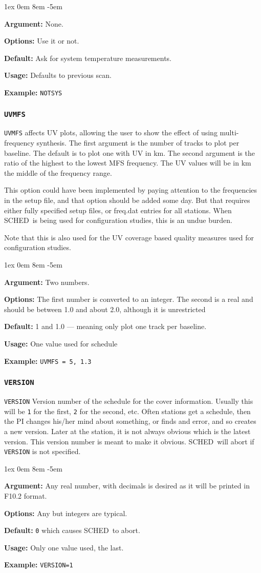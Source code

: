 \documentclass{report}
\newcommand{\schedb}{{\sc SCHED~}}
\newcommand{\rcwbox}[5]{
  \begin{list}{}{\parsep 1ex  \itemsep 0em
                 \leftmargin 8em  \itemindent -5em }
    \item {\bf Argument:} #1
    \item {\bf Options:}  #2
    \item {\bf Default:}  #3
    \item {\bf Usage:}    #4
    \item {\bf Example:}  #5
  \end{list}
}
\begin{document}
\rcwbox
{None.}
{Use it or not.}
{Ask for system temperature measurements.}
{Defaults to previous scan.}
{{\tt NOTSYS}}


\subsubsection{\label{MP:UVMFS}{\tt UVMFS}}

{\tt UVMFS} affects UV plots, allowing the user to show the effect
of using multi-frequency synthesis.  The first argument is the
number of tracks to plot per baseline.  The default is to plot one
with UV in km.  The second argument is the ratio of the highest
to the lowest MFS frequency.  The UV values will be in km the
middle of the frequency range.

This option could have been implemented by paying attention to
the frequencies in the setup file, and that option should be
added some day.  But that requires either fully specified setup
files, or freq.dat entries for all stations.  When \schedb is being
used for configuration studies, this is an undue burden.

Note that this is also used for the UV coverage based quality
measures used for configuration studies.

\rcwbox
{Two numbers.}
{The first number is converted to an integer.  The second is a real
and should be between 1.0 and about 2.0, although it is unrestricted}
{1 and 1.0 --- meaning only plot one track per baseline.}
{One value used for schedule}
{{\tt UVMFS = 5, 1.3 }}



\subsubsection{\label{MP:VERSION}{\tt VERSION}}

{\tt VERSION} Version number of the schedule for the cover
information. Usually this will be {\tt 1} for the first, {\tt 2} for
the second, etc. Often stations get a schedule, then the PI changes
his/her mind about something, or finds and error, and so creates a new
version. Later at the station, it is not always obvious which is the
latest version.  This version number is meant to make it
obvious. \schedb will abort if {\tt VERSION} is not specified.

\rcwbox
{Any real number, with decimals is desired as it will be printed in
F10.2 format.}
{Any but integers are typical.}
{{\tt 0} which causes \schedb to abort.}
{Only one value used, the last.}
{{\tt VERSION=1}}
\end{document}
